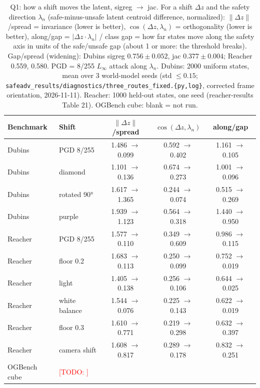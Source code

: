 \documentclass{article}
\newcommand{\todo}[1]{\textcolor{red}{[TODO: #1]}}
\begin{document}
\begin{table}[t]\centering\small
\caption{Q1: how a shift moves the latent, sigreg $\to$ jac. For a shift $\Delta z$ and the safety direction $\lambda_n$ (safe-minus-unsafe latent centroid difference, normalized): $\|\Delta z\|$/spread = invariance (lower is better), $\cos(\Delta z, \lambda_n)$ = orthogonality (lower is better), along/gap = $|\Delta z \cdot \lambda_n|$ / class gap = how far states move along the safety axis in units of the safe/unsafe gap (about 1 or more: the threshold breaks). Gap/spread (widening): Dubins sigreg $0.756 \pm 0.052$, jac $0.377 \pm 0.004$; Reacher 0.559, 0.580. PGD = 8/255 $L_\infty$ attack along $\lambda_n$. Dubins: 2000 uniform states, mean over 3 world-model seeds (std $\le 0.15$; \texttt{safeadv\_results/diagnostics/three\_routes\_fixed.\{py,log\}}, corrected frame orientation, 2026-11-11). Reacher: 1000 held-out states, one seed (reacher-results Table 21). OGBench cube: blank = not run.}
\label{tab:q1_mech}
\begin{tabular}{llccc}
\toprule
Benchmark & Shift & $\|\Delta z\|$/spread & $\cos(\Delta z, \lambda_n)$ & along/gap \\
\midrule
Dubins & PGD 8/255 & 1.486 $\to$ 0.099 & 0.592 $\to$ 0.402 & 1.161 $\to$ 0.105 \\
Dubins & diamond & 1.101 $\to$ 0.136 & 0.674 $\to$ 0.273 & 1.001 $\to$ 0.096 \\
Dubins & rotated 90° & 1.617 $\to$ 1.365 & 0.244 $\to$ 0.074 & 0.515 $\to$ 0.269 \\
Dubins & purple & 1.939 $\to$ 1.123 & 0.564 $\to$ 0.318 & 1.440 $\to$ 0.950 \\
\midrule
Reacher & PGD 8/255 & 1.577 $\to$ 0.110 & 0.349 $\to$ 0.609 & 0.986 $\to$ 0.115 \\
Reacher & floor 0.2 & 1.683 $\to$ 0.113 & 0.250 $\to$ 0.099 & 0.752 $\to$ 0.019 \\
Reacher & light & 1.405 $\to$ 0.138 & 0.256 $\to$ 0.106 & 0.644 $\to$ 0.025 \\
Reacher & white balance & 1.544 $\to$ 0.076 & 0.225 $\to$ 0.143 & 0.622 $\to$ 0.019 \\
Reacher & floor 0.3 & 1.610 $\to$ 0.771 & 0.219 $\to$ 0.298 & 0.632 $\to$ 0.397 \\
Reacher & camera shift & 1.608 $\to$ 0.817 & 0.289 $\to$ 0.178 & 0.832 $\to$ 0.251 \\
\midrule
OGBench cube & \todo{} &  &  &  \\
\bottomrule
\end{tabular}
\end{table}
\end{document}
